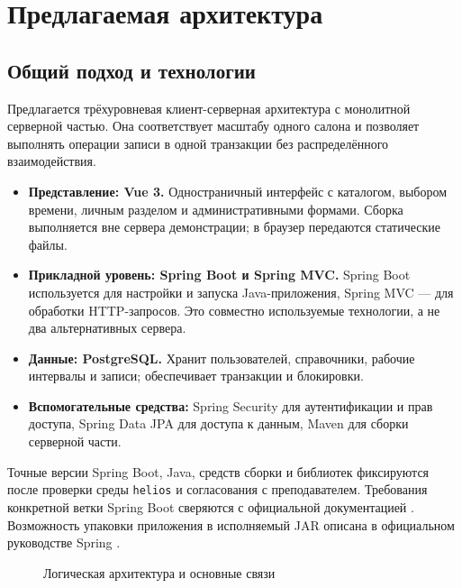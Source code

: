 \section{Предлагаемая архитектура}
\subsection{Общий подход и технологии}
Предлагается трёхуровневая клиент-серверная архитектура с монолитной серверной частью. Она соответствует масштабу одного салона и позволяет выполнять операции записи в одной транзакции без распределённого взаимодействия.
\begin{itemize}
\item \textbf{Представление: Vue 3.} Одностраничный интерфейс с каталогом, выбором времени, личным разделом и административными формами. Сборка выполняется вне сервера демонстрации; в браузер передаются статические файлы.
\item \textbf{Прикладной уровень: Spring Boot и Spring MVC.} Spring Boot используется для настройки и запуска Java-приложения, Spring MVC --- для обработки HTTP-запросов. Это совместно используемые технологии, а не два альтернативных сервера.
\item \textbf{Данные: PostgreSQL.} Хранит пользователей, справочники, рабочие интервалы и записи; обеспечивает транзакции и блокировки.
\item \textbf{Вспомогательные средства:} Spring Security для аутентификации и прав доступа, Spring Data JPA для доступа к данным, Maven для сборки серверной части.
\end{itemize}
Точные версии Spring Boot, Java, средств сборки и библиотек фиксируются после проверки среды \texttt{helios} и согласования с преподавателем. Требования конкретной ветки Spring Boot сверяются с официальной документацией \cite{spring-req}. Возможность упаковки приложения в исполняемый JAR описана в официальном руководстве Spring \cite{spring-guide}.

\begin{figure}[htbp]
\centering
{}
\caption{Логическая архитектура и основные связи}
\end{figure}

